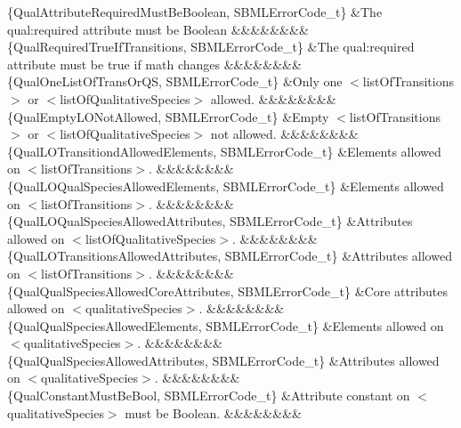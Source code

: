\begin{DoxyParagraph}{}
\begin{longtabu}
\{Qual\+Attribute\+Required\+Must\+Be\+Boolean, S\+B\+M\+L\+Error\+Code\+\_\+t\} &The qual\+:required attribute must be Boolean &&&&&&&&\\
\{Qual\+Required\+True\+If\+Transitions, S\+B\+M\+L\+Error\+Code\+\_\+t\} &The qual\+:required attribute must be \textquotesingle{}true\textquotesingle{} if math changes &&&&&&&&\\
\{Qual\+One\+List\+Of\+Trans\+Or\+QS, S\+B\+M\+L\+Error\+Code\+\_\+t\} &Only one {\ttfamily $<$list\+Of\+Transitions$>$} or {\ttfamily $<$list\+Of\+Qualitative\+Species$>$} allowed. &&&&&&&&\\
\{Qual\+Empty\+L\+O\+Not\+Allowed, S\+B\+M\+L\+Error\+Code\+\_\+t\} &Empty {\ttfamily $<$list\+Of\+Transitions$>$} or {\ttfamily $<$list\+Of\+Qualitative\+Species$>$} not allowed. &&&&&&&&\\
\{Qual\+L\+O\+Transitiond\+Allowed\+Elements, S\+B\+M\+L\+Error\+Code\+\_\+t\} &Elements allowed on {\ttfamily $<$list\+Of\+Transitions$>$}. &&&&&&&&\\
\{Qual\+L\+O\+Qual\+Species\+Allowed\+Elements, S\+B\+M\+L\+Error\+Code\+\_\+t\} &Elements allowed on {\ttfamily $<$list\+Of\+Transitions$>$}. &&&&&&&&\\
\{Qual\+L\+O\+Qual\+Species\+Allowed\+Attributes, S\+B\+M\+L\+Error\+Code\+\_\+t\} &Attributes allowed on {\ttfamily $<$list\+Of\+Qualitative\+Species$>$}. &&&&&&&&\\
\{Qual\+L\+O\+Transitions\+Allowed\+Attributes, S\+B\+M\+L\+Error\+Code\+\_\+t\} &Attributes allowed on {\ttfamily $<$list\+Of\+Transitions$>$}. &&&&&&&&\\
\{Qual\+Qual\+Species\+Allowed\+Core\+Attributes, S\+B\+M\+L\+Error\+Code\+\_\+t\} &Core attributes allowed on {\ttfamily $<$qualitative\+Species$>$}. &&&&&&&&\\
\{Qual\+Qual\+Species\+Allowed\+Elements, S\+B\+M\+L\+Error\+Code\+\_\+t\} &Elements allowed on {\ttfamily $<$qualitative\+Species$>$}. &&&&&&&&\\
\{Qual\+Qual\+Species\+Allowed\+Attributes, S\+B\+M\+L\+Error\+Code\+\_\+t\} &Attributes allowed on {\ttfamily $<$qualitative\+Species$>$}. &&&&&&&&\\
\{Qual\+Constant\+Must\+Be\+Bool, S\+B\+M\+L\+Error\+Code\+\_\+t\} &Attribute \textquotesingle{}constant\textquotesingle{} on {\ttfamily $<$qualitative\+Species$>$} must be Boolean. &&&&&&&&\\

\end{longtabu}
\end{DoxyParagraph}
